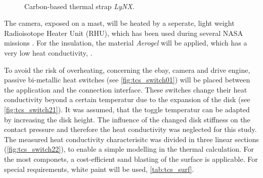 \begin{figure}[h]
	\centering
	\qquad\qquad
	\caption{Carbon-based thermal strap \textit{LyNX}\textsuperscript{\tiny\textregistered}.}
	\label{fig:tcs_strap01}
\end{figure}


The camera, exposed on a mast, will be heated by a seperate, light weight Radioisotope Heater Unit (RHU), which has  been used during several NASA missions \cite{ref_tcs_02}.
For the insulation, the material \textit{Aerogel} will be applied, which has a very low heat conductivity, \cite{ref_tcs_03}.

To avoid the risk of overheating, concerning the ebay, camera and drive engine, passive bi-metallic heat switches (see \autoref{fig:tcs_switch01}) will be  placed between the application and the connection interface.
These switches change their heat conductivity beyond a certain temperatur due to the expansion of the disk (see \autoref{fig:tcs_switch21}).
It was assumed, that the toggle temperatur can be adapted by increasing the disk height.
The influence of the changed disk stiffness on the contact pressure and therefore the heat conductivity was neglected for this study.
The measured heat conductivity characterisitc was divided in three linear sections (\autoref{fig:tcs_switch22}), to enable a simple modelling in the thermal calculation.
For the most componets, a cost-efficient sand blasting of the surface is applicable.
For special requirements, white paint will be used, \autoref{tab:tcs_surf}.

